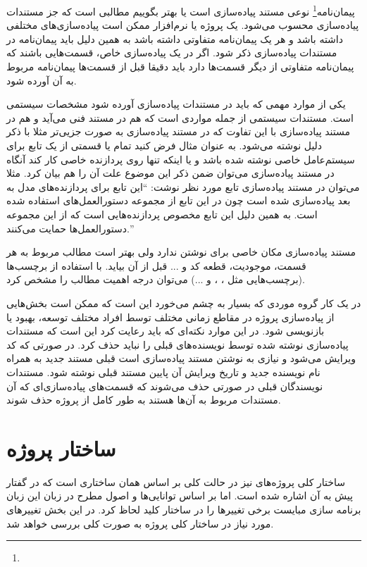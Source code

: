 پیمان‌نامه\footnote{}  نوعی مستند پیاده‌سازی است یا بهتر بگوییم
مطالبی است که جز مستندات پیاده‌سازی محسوب می‌شود. یک پروژه یا نرم‌افزار ممکن است
پیاده‌سازی‌های مختلفی داشته باشد و هر یک پیمان‌نامه متفاوتی داشته باشد به همین
دلیل باید پیمان‌نامه در مستندات پیاده‌سازی ذکر شود. اگر در یک پیاده‌سازی خاص،
قسمت‌هایی باشند که پیمان‌نامه متفاوتی از دیگر قسمت‌ها دارد باید دقیقا قبل از
قسمت‌ها پیمان‌نامه مربوط به آن آورده شود.

یکی از موارد مهمی که باید در مستندات پیاده‌سازی آورده شود مشخصات سیستمی است.
مستندات سیستمی از جمله مواردی است که هم در مستند فنی می‌آید و هم در مستند
پیاده‌سازی با این تفاوت که در مستند پیاده‌سازی به صورت جزیی‌تر مثلا با ذکر دلیل
نوشته می‌شود. به عنوان مثال فرض کنید تمام یا قسمتی از یک تابع برای سیستم‌عامل
خاصی نوشته شده باشد و یا اینکه تنها روی پردازنده خاصی کار کند آنگاه در مستند
پیاده‌سازی می‌توان ضمن ذکر این موضوع علت آن را هم بیان کرد. مثلا می‌توان در
مستند پیاده‌سازی تابع مورد نظر نوشت: ``این تابع برای پردازنده‌های 
مدل  به بعد پیاده‌سازی شده است چون در این تابع از مجموعه
دستورالعمل‌های  استفاده شده است. به همین دلیل این تابع مخصوص
پردازنده‌هایی است که از این مجموعه دستورالعمل‌ها حمایت می‌کنند.''

مستند پیاده‌سازی مکان خاصی برای نوشتن ندارد ولی بهتر است مطالب مربوط به هر قسمت،
موجودیت، قطعه کد و ... قبل از آن بیاید. با استفاده از برچسب‌ها (برچسب‌هایی مثل
، ،  و ...) می‌توان درجه اهمیت مطالب را مشخص کرد.

در یک کار گروه موردی که بسیار به چشم می‌خورد این است که ممکن است بخش‌هایی از
پیاده‌سازی پروژه در مقاطع زمانی مختلف توسط افراد مختلف توسعه، بهبود یا بازنویسی
شود. در این موارد نکته‌ای که باید رعایت کرد این است که مستندات پیاده‌سازی نوشته
شده توسط نویسنده‌های قبلی را نباید حذف کرد. در صورتی که کد ویرایش می‌شود و نیازی
به نوشتن مستند پیاده‌سازی است قبلی مستند جدید به همراه نام نویسنده جدید و تاریخ
ویرایش آن پایین مستند قبلی نوشته شود.
مستندات نویسندگان قبلی در صورتی حذف می‌شوند که قسمت‌های پیاده‌سازی‌ای که آن
مستندات مربوط به آن‌ها هستند به طور کامل از پروژه حذف شوند.



\section{ساختار پروژه}

ساختار کلی پروژه‌های  نیز در حالت کلی بر اساس همان ساختاری است که در
گفتار پیش به آن اشاره شده است. اما بر اساس توانایی‌ها و اصول مطرح در زبان این
زبان برنامه سازی مبایست برخی تغییرها را در ساختار کلید لحاظ کرد. در این بخش
تغییرهای مورد نیاز در ساختار کلی پروژه به صورت کلی بررسی خواهد شد.

